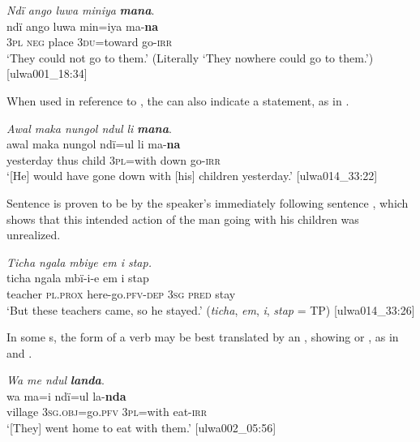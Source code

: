 \ea%
    \label{ex:verbs:36}
          \textit{Ndï ango luwa miniya} \textbf{\textit{mana}}.\\
\gll ndï  ango  luwa  min=iya    ma-\textbf{na}\\
    3\textsc{pl}  \textsc{neg}  place  3\textsc{du}=toward  go-\textsc{irr}\\
\glt `They could not go to them.’ (Literally ‘They nowhere could go to them.’) [ulwa001\_18:34]
\z

When used in reference to  , the   can also indicate a  statement, as in .

\ea%
    \label{ex:verbs:37}
          \textit{Awal maka nungol ndul li} \textbf{\textit{mana}}.\\
\gll awal     maka   nungol  ndï=ul    li     ma-\textbf{na}\\
    yesterday  thus  child  3\textsc{pl}=with  down  go-\textsc{irr}\\
\glt `[He] would have gone down with [his] children yesterday.’ [ulwa014\_33:22]
\z

Sentence  is proven to be  by the speaker’s immediately following sentence , which shows that this intended action of the man going with his children was unrealized.

\ea%
    \label{ex:verbs:38}
          \textit{Ticha ngala mbiye em i stap.}\\
\gll    ticha   ngala     mbï-i-e       em    i     stap\\
    teacher  \textsc{pl.prox}  here-go.\textsc{pfv-dep}  3\textsc{sg}  \textsc{pred}  stay\\
\glt `But these teachers came, so he stayed.’ (\textit{ticha}, \textit{em}, \textit{i}, \textit{stap} = TP) [ulwa014\_33:26]
\z

In some s, the  form of a verb may be best translated by an  , showing  or , as in  and .

\ea%
    \label{ex:verbs:39}
          \textit{Wa me ndul} \textbf{\textit{landa}}.\\
\gll wa    ma=i        ndï=ul    la-\textbf{nda}\\
    village  3\textsc{sg.obj}=go.\textsc{pfv}  3\textsc{pl}=with  eat-\textsc{irr}\\
\glt `[They] went home to eat with them.’ [ulwa002\_05:56]
\z

